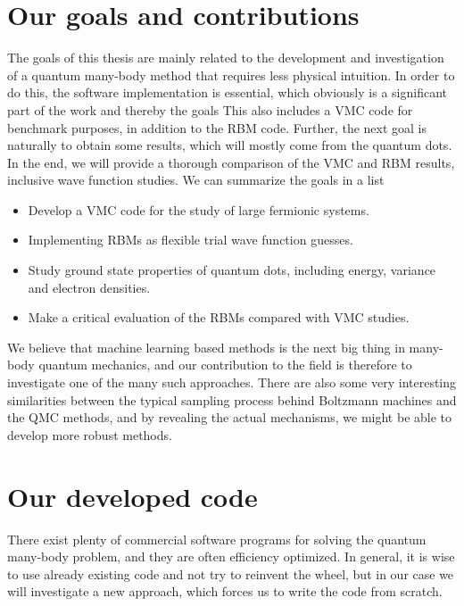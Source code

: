 \section{Our goals and contributions} \label{sec:goals}
The goals of this thesis are mainly related to the development and investigation of a quantum many-body method that requires less physical intuition. In order to do this, the software implementation is essential, which obviously is a significant part of the work and thereby the goals This also includes a VMC code for benchmark purposes, in addition to the RBM code. Further, the next goal is naturally to obtain some results, which will mostly come from the quantum dots. In the end, we will provide a thorough comparison of the VMC and RBM results, inclusive wave function studies. We can summarize the goals in a list
\begin{itemize}
	\item Develop a VMC code for the study of large fermionic systems.
	\item Implementing RBMs as flexible trial wave function guesses.
	\item Study ground state properties of quantum dots, including energy, variance and electron densities.
	\item Make a critical evaluation of the RBMs compared with VMC studies.
\end{itemize}

We believe that machine learning based methods is the next big thing in many-body quantum mechanics, and our contribution to the field is therefore to investigate one of the many such approaches. There are also some very interesting similarities between the typical sampling process behind Boltzmann machines and the QMC methods, and by revealing the actual mechanisms, we might be able to develop more robust methods. 

\section{Our developed code}
There exist plenty of commercial software programs for solving the quantum many-body problem, and they are often efficiency optimized. In general, it is wise to use already existing code and not try to reinvent the wheel, but in our case we will investigate a new approach, which forces us to write the code from scratch. 

